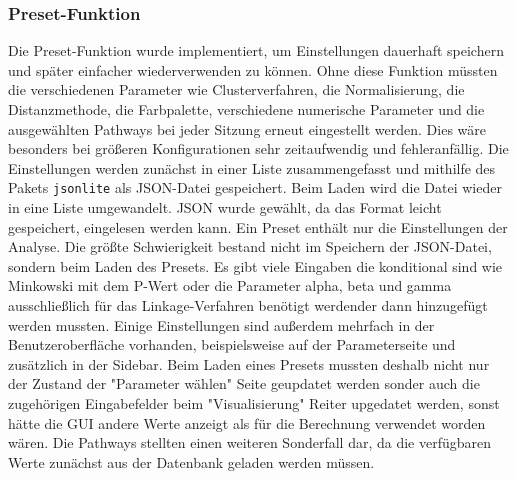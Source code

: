 \documentclass[12pt]{article}
\begin{document}
\subsubsection{Preset-Funktion}
\label{Preset-Funktion}
Die Preset-Funktion wurde implementiert, um Einstellungen dauerhaft speichern und später einfacher wiederverwenden zu können. Ohne diese Funktion müssten die verschiedenen Parameter wie Clusterverfahren, die Normalisierung, die Distanzmethode, die Farbpalette, verschiedene numerische Parameter und die ausgewählten Pathways bei jeder Sitzung erneut eingestellt werden. Dies wäre besonders bei größeren Konfigurationen sehr zeitaufwendig und fehleranfällig. Die Einstellungen werden zunächst in einer Liste zusammengefasst und mithilfe des Pakets \texttt{jsonlite} als JSON-Datei gespeichert. Beim Laden wird die Datei wieder in eine Liste umgewandelt. JSON wurde gewählt, da das Format leicht gespeichert, eingelesen werden kann. Ein Preset enthält nur die Einstellungen der Analyse. Die größte Schwierigkeit bestand nicht im Speichern der JSON-Datei, sondern beim Laden des Presets. Es gibt viele Eingaben die konditional sind wie Minkowski mit dem P-Wert oder die Parameter alpha, beta und gamma ausschließlich für das  Linkage-Verfahren benötigt werdender dann hinzugefügt werden mussten. Einige Einstellungen sind außerdem mehrfach in der Benutzeroberfläche vorhanden, beispielsweise auf der Parameterseite und zusätzlich in der Sidebar. Beim Laden eines Presets mussten deshalb nicht nur der Zustand der "Parameter wählen" Seite geupdatet werden sonder auch die zugehörigen Eingabefelder beim "Visualisierung" Reiter upgedatet werden, sonst hätte die GUI andere Werte anzeigt als für die Berechnung verwendet worden wären. Die Pathways stellten einen weiteren Sonderfall dar, da die verfügbaren Werte zunächst aus der Datenbank geladen werden müssen.
\end{document}
